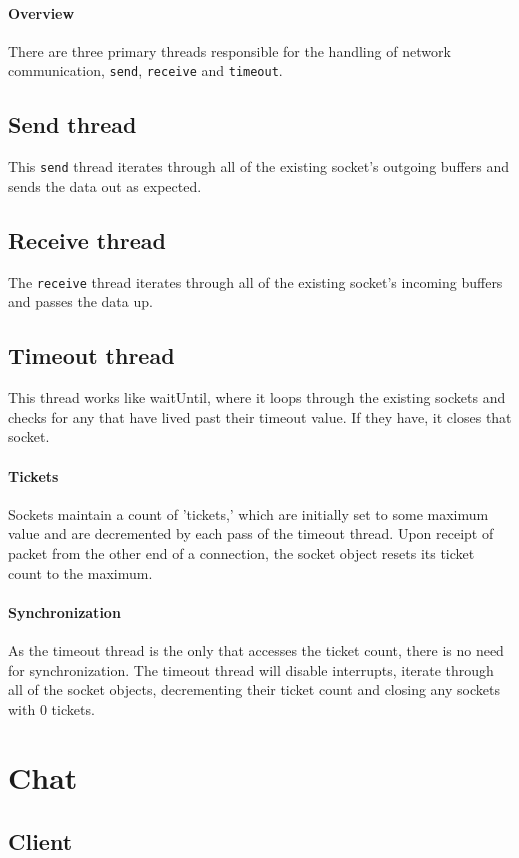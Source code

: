 \documentclass[]{article}
\begin{document}
\paragraph{Overview}
There are three primary threads responsible for the handling of network communication, \texttt{send}, \texttt{receive} and \texttt{timeout}.

\subsection{Send thread}
This \texttt{send} thread iterates through all of the existing socket's outgoing buffers and sends the data out as expected.
\subsection{Receive thread}
The \texttt{receive} thread iterates through all of the existing socket's incoming buffers and passes the data up.

\subsection{Timeout thread}
This thread works like waitUntil, where it loops through the existing sockets and checks for any that have lived past their timeout value. If they have, it closes that socket.

\paragraph{Tickets}
Sockets maintain a count of 'tickets,' which are initially set to some maximum value and are decremented by each pass of the timeout thread. Upon receipt of packet from the other end of a connection, the socket object resets its ticket count to the maximum.

\paragraph{Synchronization}
As the timeout thread is the only that accesses the ticket count, there is no need for synchronization. The timeout thread will disable interrupts, iterate through all of the socket objects, decrementing their ticket count and closing any sockets with 0 tickets.

\section{Chat}
\subsection{Client}
\end{document}
